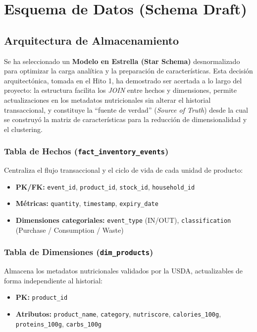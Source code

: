 \documentclass[12pt,a4paper]{article}
\newcommand{\code}[1]{\texttt{\small #1}}
\begin{document}
\section{Esquema de Datos (Schema Draft)}

\subsection{Arquitectura de Almacenamiento}

Se ha seleccionado un \textbf{Modelo en Estrella (Star Schema)} desnormalizado para optimizar la carga analítica y la preparación de características. Esta decisión arquitectónica, tomada en el Hito 1, ha demostrado ser acertada a lo largo del proyecto: la estructura facilita los \textit{JOIN} entre hechos y dimensiones, permite actualizaciones en los metadatos nutricionales sin alterar el historial transaccional, y constituye la ``fuente de verdad'' (\textit{Source of Truth}) desde la cual se construyó la matriz de características para la reducción de dimensionalidad y el clustering.

\subsubsection{Tabla de Hechos (\texttt{fact\_inventory\_events})}

Centraliza el flujo transaccional y el ciclo de vida de cada unidad de producto:

\begin{itemize}
    \item \textbf{PK/FK:} \code{event\_id}, \code{product\_id}, \code{stock\_id}, \code{household\_id}
    \item \textbf{Métricas:} \code{quantity}, \code{timestamp}, \code{expiry\_date}
    \item \textbf{Dimensiones categoriales:} \code{event\_type} (IN/OUT), \code{classification} (Purchase / Consumption / Waste)
\end{itemize}

\subsubsection{Tabla de Dimensiones (\texttt{dim\_products})}

Almacena los metadatos nutricionales validados por la USDA, actualizables de forma independiente al historial:

\begin{itemize}
    \item \textbf{PK:} \code{product\_id}
    \item \textbf{Atributos:} \code{product\_name}, \code{category}, \code{nutriscore}, \code{calories\_100g}, \code{proteins\_100g}, \code{carbs\_100g}
\end{itemize}
\end{document}
